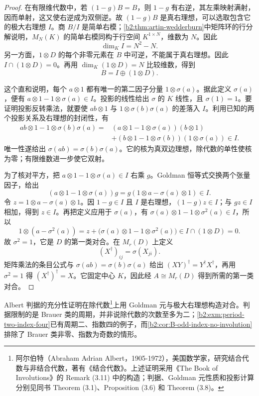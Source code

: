 \begin{proof}
	在有限维代数中，若 \((1-g)B=B\)，则 \(1-g\) 有右逆，其左乘映射满射，因而单射，这又使右逆成为双侧逆。故 \((1-g)B\) 是真右理想，可以选取包含它的极大右理想 \(I\)。商 \(B/I\) 是简单右模；\cref{b2:thm:artin-wedderburn}中矩阵环的行分解说明，\(M_N(K)\) 的简单右模同构于行空间 \(K^{1\times N}\)，维数为 \(N\)。因此
	\[
		\dim_KI=N^2-N.
	\]
	另一方面，\(1\otimes D\) 的每个非零元素在 \(B\) 中可逆，不能属于真右理想。因此 \(I\cap(1\otimes D)=0\)。再用 \(\dim_K(1\otimes D)=N\) 比较维数，得到
	\[
		B=I\oplus(1\otimes D).
	\]

	这个直和说明，每个 \(a\otimes1\) 都有唯一的第二因子分量 \(1\otimes\sigma(a)\)。据此定义 \(\sigma(a)\)，便有 \(a\otimes1-1\otimes\sigma(a)\in I\)。投影的线性给出 \(\sigma\) 的 \(K\) 线性，且 \(\sigma(1)=1\)。要证明投影反转乘法，就要使 \(ab\otimes1\) 与 \(1\otimes\sigma(b)\sigma(a)\) 的差落入 \(I\)。利用已知的两个投影关系及右理想的封闭性，有
	\[
		\begin{aligned}
			ab\otimes1-1\otimes\sigma(b)\sigma(a) ={}&(a\otimes1-1\otimes\sigma(a))(b\otimes1)\\
			&+(b\otimes1-1\otimes\sigma(b))(1\otimes\sigma(a))\in I.
		\end{aligned}
	\]
	唯一性遂给出 \(\sigma(ab)=\sigma(b)\sigma(a)\)。它的核为真双边理想，除代数的单性使核为零；有限维数进一步使它双射。

	为了核对平方，把 \(a\otimes1-1\otimes\sigma(a)\in I\) 右乘 \(g\)。Goldman 恒等式交换两个张量因子，给出
	\[
		(a\otimes1-1\otimes\sigma(a))g =g(1\otimes a-\sigma(a)\otimes1)\in I.
	\]
	令 \(z=1\otimes a-\sigma(a)\otimes1\)。因 \(1-g\in I\) 且 \(I\) 是右理想，\((1-g)z\in I\)；与 \(gz\in I\) 相加，得到 \(z\in I\)。再把定义应用于 \(\sigma(a)\)，有 \(\sigma(a)\otimes1-1\otimes\sigma^2(a)\in I\)，所以
	\[
		1\otimes(a-\sigma^2(a)) =z+\bigl(\sigma(a)\otimes1-1\otimes\sigma^2(a)\bigr) \in I\cap(1\otimes D)=0.
	\]
	故 \(\sigma^2=1\)，它是 \(D\) 的第一类对合。在 \(M_r(D)\) 上定义
	\[
		(X^\dagger)_{ij}=\sigma(X_{ji}).
	\]
	矩阵乘法的条目公式与 \(\sigma(ab)=\sigma(b)\sigma(a)\) 给出 \((XY)^\dagger=Y^\dagger X^\dagger\)，再用 \(\sigma^2=1\) 得 \((X^\dagger)^\dagger=X\)。它固定中心 \(K\)，因此经 \(A\cong M_r(D)\) 得到所需的第一类对合。
\end{proof}

Albert 判据的充分性证明在除代数\footnote{阿尔伯特（Abraham Adrian Albert，1905-1972），美国数学家，研究结合代数与非结合代数，著有《结合代数》。上述证明采用《The Book of Involutions》的 Remark (3.11) 中的构造；判据、Goldman 元性质和投影计算分别见同书 Theorem (3.1)、Proposition (3.6) 和 Theorem (3.8)\cite[Theorem (3.1), p. 31; Proposition (3.6), pp. 32--33; Theorem (3.8), pp. 34--35; Remark (3.11), p. 36]{KnusMerkurjevRostTignol1998Involutions}。}上用 Goldman 元与极大右理想构造对合。判据限制的是 Brauer 类的周期，并非说除代数的次数至多为二；\cref{b2:exm:period-two-index-four}已有周期二、指数四的例子，而\cref{b2:cor:B-odd-index-no-involution}排除了 Brauer 类非零、指数为奇数的情形。

